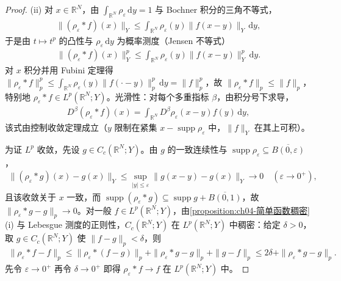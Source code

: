 \documentclass[../../main.tex]{subfiles}%
\begin{document}
\begin{proof}
(ii) 对 $x\in\mathbb{R}^N$，由 $\int_{\mathbb{R}^N}\rho_\varepsilon\,\mathrm{d}y=1$ 与 Bochner 积分的三角不等式，
\begin{align*}
\|(\rho_\varepsilon*f)(x)\|_Y\leqslant\int_{\mathbb{R}^N}\rho_\varepsilon(y)\|f(x-y)\|_Y\,\mathrm{d}y ,
\end{align*}
于是由 $t\mapsto t^p$ 的凸性与 $\rho_\varepsilon\,\mathrm{d}y$ 为概率测度（Jensen 不等式）
\begin{align*}
\|(\rho_\varepsilon*f)(x)\|_Y^p\leqslant\int_{\mathbb{R}^N}\rho_\varepsilon(y)\|f(x-y)\|_Y^p\,\mathrm{d}y .
\end{align*}
对 $x$ 积分并用 Fubini 定理得 $\|\rho_\varepsilon*f\|_p^p\leqslant\int_{\mathbb{R}^N}\rho_\varepsilon(y)\|f(\cdot-y)\|_p^p\,\mathrm{d}y=\|f\|_p^p$，故 $\|\rho_\varepsilon*f\|_p\leqslant\|f\|_p$，特别地 $\rho_\varepsilon*f\in L^p(\mathbb{R}^N;Y)$。光滑性：对每个多重指标 $\beta$，由积分号下求导，
\begin{align*}
D^\beta(\rho_\varepsilon*f)(x)=\int_{\mathbb{R}^N}D^\beta\rho_\varepsilon(x-y)f(y)\,\mathrm{d}y ,
\end{align*}
该式由控制收敛定理成立（$y$ 限制在紧集 $x-\operatorname{supp}\rho_\varepsilon$ 中，$\|f\|_Y$ 在其上可积）。

为证 $L^p$ 收敛，先设 $g\in C_c(\mathbb{R}^N;Y)$。由 $g$ 的一致连续性与 $\operatorname{supp}\rho_\varepsilon\subseteq\overline{B(0,\varepsilon)}$，
\begin{align*}
\|(\rho_\varepsilon*g)(x)-g(x)\|_Y\leqslant\sup_{|y|\leqslant\varepsilon}\|g(x-y)-g(x)\|_Y\to0\quad(\varepsilon\to0^+),
\end{align*}
且该收敛关于 $x$ 一致，而 $\operatorname{supp}(\rho_\varepsilon*g)\subseteq\operatorname{supp}g+\overline{B(0,1)}$，故 $\|\rho_\varepsilon*g-g\|_p\to0$。对一般 $f\in L^p(\mathbb{R}^N;Y)$，由\cref{proposition:ch04-简单函数稠密}(i) 与 Lebesgue 测度的正则性，$C_c(\mathbb{R}^N;Y)$ 在 $L^p(\mathbb{R}^N;Y)$ 中稠密：给定 $\delta>0$，取 $g\in C_c(\mathbb{R}^N;Y)$ 使 $\|f-g\|_p<\delta$，则
\begin{align*}
\|\rho_\varepsilon*f-f\|_p\leqslant\|\rho_\varepsilon*(f-g)\|_p+\|\rho_\varepsilon*g-g\|_p+\|g-f\|_p\leqslant2\delta+\|\rho_\varepsilon*g-g\|_p .
\end{align*}
先令 $\varepsilon\to0^+$ 再令 $\delta\to0^+$ 即得 $\rho_\varepsilon*f\to f$ 在 $L^p(\mathbb{R}^N;Y)$ 中。
\end{proof}
\end{document}
